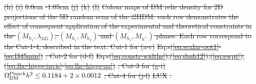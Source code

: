 \documentclass[12pt,a4paper]{article}
\providecommand{\DIFaddtex}[1]{{\protect\color{blue}\uwave{#1}}} %
\providecommand{\DIFdeltex}[1]{{\protect\color{red}\sout{#1}}}                      %
\providecommand{\DIFaddbegin}{} %
\providecommand{\DIFaddend}{} %
\providecommand{\DIFdelbegin}{} %
\providecommand{\DIFdelend}{} %
\providecommand{\DIFadd}[1]{\texorpdfstring{\DIFaddtex{#1}}{#1}} %
\providecommand{\DIFdel}[1]{\texorpdfstring{\DIFdeltex{#1}}{}} %
\begin{document}
{\DIFdel{(h)}%
\DIFdel{(i)
}%
\DIFdel{0.0cm
}%
\DIFdelend \DIFaddbegin \DIFadd{at LUX.}\DIFaddend }
\DIFdelbegin %
\DIFdel{-1.05cm
}%
\DIFdel{(j)}%
\DIFdel{(k)}%
\DIFdel{(l)
}%
{%
\DIFdel{Colour maps of DM relic density for 2D projections of the 5D random scan of the i2HDM:  
each row demonstrates the effect of consequent application
of the experimental and theoretical constraints in the $(M_{h_1},\lambda_{345})$, $(M_{h_1},M_{h_2})$ and 
$(M_{h_1},M_{h^{+}})$ planes. Each row correspond to the Cut-1-4, described in the text: Cut-1 for (a-c) }%
\DIFdel{Eq.s(\ref{eq:scalar-pot1}-\ref{eq:l345min})}%
\DIFdel{; Cut-2 for (d-f) }%
\DIFdel{Eq.s(\ref{eq:constr-widths}),(\ref{eq:dmh12}),(\ref{eq:ewpt}),(\ref{eq:lhc-higgs-invis}-\ref{eq:lhc-higgs-aa})}%
\DIFdel{; Cut-3 for (g-i) }%
\DIFdel{$\Omega_{\rm DM}^{\rm Planck} h^2 \le 0.1184+2\times 0.0012$}%
\DIFdel{; Cut-4 for (j-l) }%
\DIFdel{LUX}%
\DIFdel{.
}%
} 
\DIFdelend \DIFaddbegin 
\end{document}
